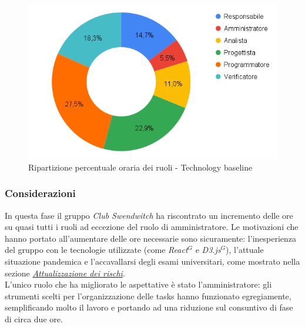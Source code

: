 \begin{figure}[h!]
	\centering
	\includegraphics[scale=0.37]{../../assets/Diagrammi_Excel/torta_ore_TB.png}
	\caption{Ripartizione percentuale oraria dei ruoli - Technology baseline}
\end{figure}

\subsubsection{Considerazioni}
In questa fase il gruppo \textit{Club Swendwitch} ha riscontrato un incremento delle ore su quasi tutti i ruoli ad eccezione del ruolo di amministratore. Le motivazioni che hanno portato all'aumentare delle ore necessarie sono sicuramente: l'inesperienza del gruppo con le tecnologie utilizzate (come \textit{React}$^{G}$ e \textit{D3.js}$^{G}$), 
l'attuale situazione pandemica e l'accavallarsi degli esami universitari, come mostrato nella sezione \hyperref[sec:AttualizzazioneRischi]{\textit{Attualizzazione dei rischi}}.\\
L'unico ruolo che ha migliorato le aspettative è stato l'amministratore: gli strumenti scelti per l'organizzazione delle tasks hanno funzionato egregiamente, semplificando molto il lavoro e portando ad una riduzione sul consuntivo di fase di circa due ore.



